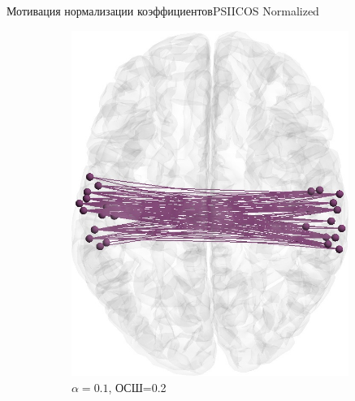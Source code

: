 \documentclass[12pt]{beamer}
\begin{document}
\begin{frame}[t]{Мотивация нормализации коэффициентов}{PSIICOS Normalized}
    
    \begin{figure}[htbp]
        \begin{subfigure}[t]{0.245\textwidth}
            \includegraphics[width=0.99\textwidth]{../images/loreta_brain_jitter_01_snr_02_phase_lag_07854.jpg}
            \caption{\tiny $\alpha=0.1$, ОСШ=0.2}\label{fig:unbiased_1_ntw_a}
        \end{subfigure}
        \begin{subfigure}[t]{0.24\textwidth}

\end{subfigure}
\end{figure}
\end{frame}
\end{document}
